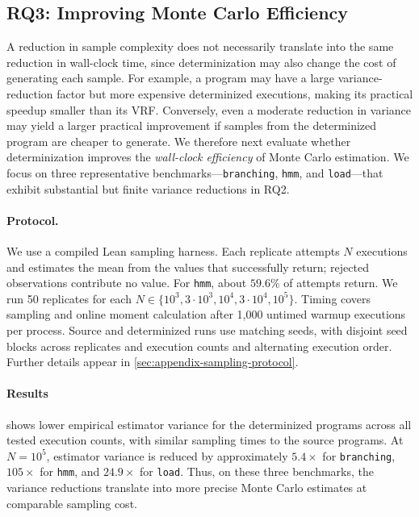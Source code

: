 \subsection{RQ3: Improving Monte Carlo Efficiency}

A reduction in sample complexity does not necessarily translate into the same reduction in wall-clock time, since determinization may also change the cost of generating each sample. For example, a program may have a large variance-reduction factor but more expensive determinized executions, making its practical speedup smaller than its VRF.  Conversely, even a moderate reduction in variance may yield a larger practical improvement if samples from the determinized program are cheaper to generate. We therefore next evaluate whether determinization improves the \emph{wall-clock efficiency} of Monte Carlo estimation.   We focus on three
representative benchmarks---\texttt{branching}, \texttt{hmm}, and
\texttt{load}---that exhibit substantial but finite variance reductions in
RQ2. 

\paragraph{Protocol.}
We use a compiled Lean sampling harness. Each replicate attempts $N$
executions and estimates the mean from the values that successfully
return; rejected observations contribute no value. For \texttt{hmm},
about $59.6\%$ of attempts return. We run 50 replicates for each
$N\in\{10^3,3\cdot10^3,10^4,3\cdot10^4,10^5\}$.
Timing covers sampling and online moment calculation after 1,000 untimed
warmup executions per process. Source and determinized runs use matching
seeds, with disjoint seed blocks across replicates and execution counts
and alternating execution order. Further details appear in
\cref{sec:appendix-sampling-protocol}.



\paragraph{Results}  shows lower empirical estimator variance for the determinized programs across all tested execution counts, with similar sampling times to the source programs. At $N=10^5$, estimator variance is reduced by approximately $5.4\times$ for \texttt{branching}, $105\times$ for \texttt{hmm}, and $24.9\times$ for \texttt{load}. Thus, on these three benchmarks, the variance reductions translate into more precise Monte Carlo estimates at comparable sampling cost.
